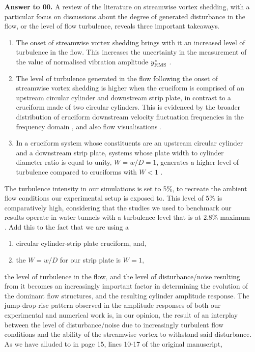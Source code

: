 \documentclass[10pt]{article}
\newcounter{question}
\newcommand{\name}{00}
\newcommand{\answer}[1]{\noindent \textbf{Answer to \name.\thequestion}\vskip 0.25cm \noindent #1 \mbox{}\\}
\begin{document}
\answer{
  A review of the literature on streamwise vortex shedding, with a particular focus on discussions about the degree of generated disturbance in the flow, or the level of flow turbulence, reveals three important takeaways.

  \begin{enumerate}
    \item The onset of streamwise vortex shedding brings with it an increased level of turbulence in the flow. This increases the uncertainty in the measurement of the \rms{} value of normalised vibration amplitude $y^{*}_{\text{RMS}}$ \citep{Shirakashi1989,Zhao2018a}.
    \item The level of turbulence generated  in the flow following the onset of streamwise vortex shedding is higher when the cruciform is comprised of an upstream circular cylinder and downstream strip plate, in contrast to a cruciform made of two circular cylinders. This is evidenced by the broader distribution of cruciform downstream velocity fluctuation frequencies in the frequency domain \citep{Kato2006,Kato2012}, and also flow visualisations \citep{Kato2012,Koide2017}.
    \item In a cruciform system whose constituents are an upstream circular cylinder and a downstream strip plate, systems whose plate width to cylinder diameter ratio is equal to unity, $W = w/D = 1$, generates a higher level of turbulence compared to cruciforms with $W < 1$ \citep{Kato2012}.
  \end{enumerate}

  The turbulence intensity in our simulations is set to 5\%, to recreate the ambient flow conditions our experimental setup is exposed to. This level of 5\% is comparatively high, considering that the studies we used to benchmark our results operate in water tunnels with a turbulence level that is at 2.8\% maximum \citep{Nguyen2012,Koide2013}. Add this to the fact that we are using a 

  \begin{enumerate}
    \item circular cylinder-strip plate cruciform, and,
    \item the $W = w/D$ for our strip plate is $W = 1$,
  \end{enumerate}

  \noindent the level of turbulence in the flow, and the level of disturbance/noise resulting from it becomes an increasingly important factor in determining the evolution of the dominant flow structures, and the resulting cylinder amplitude response. The jump-drop-rise pattern observed in the amplitude responses of both our experimental and numerical work is, in our opinion, the result of an interplay between the level of disturbance/noise due to increasingly turbulent flow conditions and the ability of the streamwise vortex to withstand said disturbance. As we have alluded to in page 15, lines 10-17 of the original manuscript,

}
\end{document}
